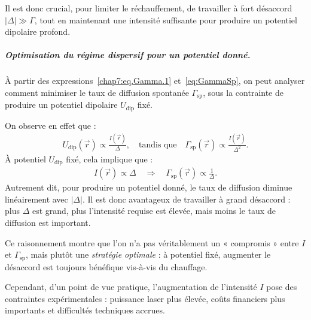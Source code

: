 Il est donc crucial, pour limiter le réchauffement, de travailler à fort désaccord \( |\Delta| \gg \Gamma \), tout en maintenant une intensité suffisante pour produire un potentiel dipolaire profond.


%

\subparagraph{Optimisation du régime dispersif pour un potentiel donné.}

À partir des expressions~\eqref{chap7:eq.Gamma.1} et~\eqref{eq:GammaSp}, on peut analyser comment minimiser le taux de diffusion spontanée \( \Gamma_{\mathrm{sp}} \), sous la contrainte de produire un potentiel dipolaire \( U_{\mathrm{dip}} \) fixé.

On observe en effet que :
\begin{eqnarray}
	U_{\mathrm{dip}}(\vec{r}) \propto \frac{I(\vec{r})}{\Delta}, \quad \text{tandis que} \quad \Gamma_{\mathrm{sp}}(\vec{r}) \propto \frac{I(\vec{r})}{\Delta^2}.	
\end{eqnarray}
À potentiel \( U_{\mathrm{dip}} \) fixé, cela implique que :
\begin{eqnarray}
	I(\vec{r}) \propto \Delta \quad \Rightarrow \quad \Gamma_{\mathrm{sp}}(\vec{r}) \propto \frac{1}{\Delta}.
\end{eqnarray}
Autrement dit, pour produire un potentiel donné, le taux de diffusion diminue linéairement avec \( |\Delta| \). Il est donc avantageux de travailler à grand désaccord : plus \( \Delta \) est grand, plus l’intensité requise est élevée, mais moins le taux de diffusion est important.

\medskip

Ce raisonnement montre que l’on n’a pas véritablement un « compromis » entre \( I \) et \( \Gamma_{\mathrm{sp}} \), mais plutôt une {\em stratégie optimale} : à potentiel fixé, augmenter le désaccord est toujours bénéfique vis-à-vis du chauffage.

\medskip

Cependant, d’un point de vue pratique, l’augmentation de l’intensité \(I\) pose des contraintes expérimentales : puissance laser plus élevée, coûts financiers plus importants et difficultés techniques accrues. 



